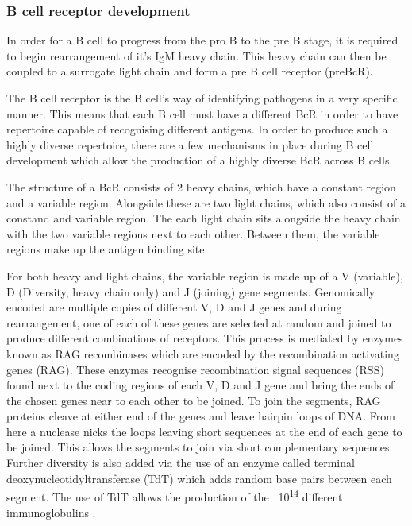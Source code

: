 \subsubsection{B cell receptor development}
\label{subsubsec:Bcellrecepdevelopment}

In order for a B cell to progress from the pro B to the pre B stage, it is required to begin rearrangement of it's IgM heavy chain.
This heavy chain can then be coupled to a surrogate light chain and form a pre B cell receptor (preBcR).

The B cell receptor is the B cell's way of identifying pathogens in a very specific manner.
This means that each B cell must have a different BcR in order to have repertoire capable of recognising different antigens.
In order to produce such a highly diverse repertoire, there are a few mechanisms in place during B cell development which allow the production of a highly diverse BcR across B cells.

The structure of a BcR consists of 2 heavy chains, which have a constant region and a variable region.
Alongside these are two light chains, which also consist of a constand and variable region.
The each light chain sits alongside the heavy chain with the two variable regions next to each other.
Between them, the variable regions make up the antigen binding site.

For both heavy and light chains, the variable region is made up of a V (variable), D (Diversity, heavy chain only) and J (joining) gene segments. 
Genomically encoded are multiple copies of different V, D and J genes and during rearrangement, one of each of these genes are selected at random and joined to produce different combinations of receptors.
This process is mediated by enzymes known as RAG recombinases which are encoded by the recombination activating genes (RAG).
These enzymes recognise recombination signal sequences (RSS) found next to the coding regions of each V, D and J gene and bring the ends of the chosen genes near to each other to be joined.
To join the segments, RAG proteins cleave at either end of the genes and leave hairpin loops of DNA.
From here a nuclease nicks the loops leaving short sequences at the end of each gene to be joined.
This allows the segments to join via short complementary sequences.
Further diversity is also added via the use of an enzyme called terminal deoxynucleotidyltransferase (TdT) which adds random base pairs between each segment.
The use of TdT allows the production of the ~10\textsuperscript{14} different immunoglobulins \citep{Motea2010}.

